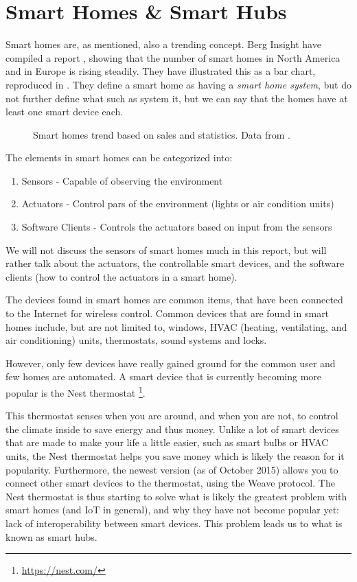 \section{Smart Homes \& Smart Hubs}\label{sec:smarthomes}
Smart homes are, as mentioned, also a trending concept. 
Berg Insight have compiled a report \cite{SMARTHOMETREND}, 
showing that the number of smart homes in North America and in Europe is rising steadily. 
They have illustrated this as a bar chart, reproduced in .
They define a smart home as having a \emph{smart home system}, 
but do not further define what such as system it, 
but we can say that the homes have at least one smart device each. 

\begin{figure}[!htb]
  \centering
  
  \caption{Smart homes trend based on sales and statistics. Data from \protect\cite{SMARTHOMETREND}.}
  \label{fig:smarthomestrend}
\end{figure}

The elements in smart homes can be categorized into:
\begin{enumerate}
  \item Sensors - Capable of observing the environment
  \item Actuators - Control pars of the environment (\eg lights or air condition units)
  \item Software Clients - Controls the actuators based on input from the sensors
\end{enumerate}

We will not discuss the sensors of smart homes much in this report, 
but will rather talk about the actuators, 
\ie the controllable smart devices,
and the software clients (how to control the actuators in a smart home).

The devices found in smart homes are common items, 
that have been connected to the Internet for wireless control.
Common devices that are found in smart homes include, but are not limited to, 
windows, HVAC (heating, ventilating, and air conditioning) units, thermostats, sound systems and locks. 

However, only few devices have really gained ground for the common user and few homes are automated.
A smart device that is currently becoming more popular is the Nest thermostat \footnote{\url{https://nest.com/}}. 

This thermostat senses when you are around, and when you are not, 
to control the climate inside to save energy and thus money.
Unlike a lot of smart devices that are made to make your life a little easier, such as smart bulbs or HVAC units,
the Nest thermostat helps you save money which is likely the reason for it popularity. 
Furthermore, the newest version (as of October 2015) allows you to connect other smart devices to the thermostat, 
using the Weave protocol. 
The Nest thermostat is thus starting to solve what is likely the greatest problem with smart homes (and IoT in general), 
and why they have not become popular yet: lack of interoperability between smart devices. 
This problem leads us to what is known as smart hubs. 

